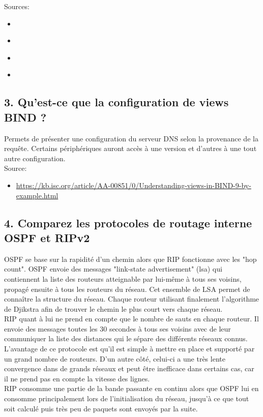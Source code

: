 \documentclass{article}
\begin{document}
Sources:
\begin{itemize}
\item \url{}
\item \url{}
\item \url{}
\item \url{}
\end{itemize}

\subsection*{3. Qu’est-ce que la configuration de views BIND ?}
Permets de présenter une configuration du serveur DNS selon la provenance de la requête. Certains périphériques auront accès à une version et d'autres à une tout autre configuration.\\

Source:
\begin{itemize}
\item \url{https://kb.isc.org/article/AA-00851/0/Understanding-views-in-BIND-9-by-example.html}
\end{itemize}

\subsection*{4. Comparez les protocoles de routage interne OSPF et RIPv2}
OSPF se base sur la rapidité d'un chemin alors que RIP fonctionne avec les "hop count". OSPF envoie des messages "link-state advertisement" (lsa) qui contiennent la liste des routeurs atteignable par lui-même à tous ses voisins, propagé ensuite à tous les routeurs du réseau. Cet ensemble de LSA permet de connaître la structure du réseau. Chaque routeur utilisant finalement l'algorithme de Djikstra afin de trouver le chemin le plus court vers chaque réseau.\\

RIP quant à lui ne prend en compte que le nombre de sauts en chaque routeur. Il envoie des messages toutes les 30 secondes à tous ses voisins avec de leur communiquer la liste des distances qui le sépare des différents réseaux connus. L'avantage de ce protocole est qu'il est simple à mettre en place et supporté par un grand nombre de routeurs. D'un autre côté, celui-ci a une très lente convergence dans de grands réseaux et peut être inefficace dans certains cas, car il ne prend pas en compte la vitesse des lignes.\\

RIP consomme une partie de la bande passante en continu alors que OSPF lui en consomme principalement lors de l'initialisation du réseau, jusqu'à ce que tout soit calculé puis très peu de paquets sont envoyés par la suite.\\
\end{document}
